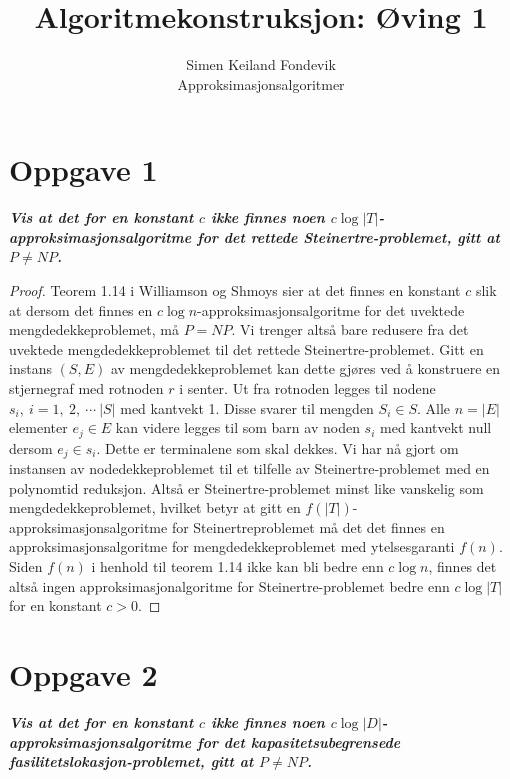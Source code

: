 \documentclass[12pt]{article}
\begin{document}
 
 
\title{Algoritmekonstruksjon: Øving 1}
\author{Simen Keiland Fondevik\\ %
Approksimasjonsalgoritmer}

\maketitle

\section{Oppgave 1}
\it{\textbf{Vis at det for en konstant $c$ ikke finnes noen $c \log |T|$-approksimasjonsalgoritme for det rettede Steinertre-problemet, gitt at $P \neq NP$.}}

\begin{proof}
Teorem 1.14 i Williamson og Shmoys sier at det finnes en konstant $c$ slik at dersom det finnes en $c \log n$-approksimasjonsalgoritme for det uvektede mengdedekkeproblemet, må $P=NP$. Vi trenger altså bare redusere fra det uvektede mengdedekkeproblemet til det rettede Steinertre-problemet. Gitt en instans $(S, E)$ av mengdedekkeproblemet kan dette gjøres ved å konstruere en stjernegraf med rotnoden $r$ i senter. Ut fra rotnoden legges til nodene $s_i,~i = 1, ~2, ~\cdots ~|S|$ med kantvekt 1. Disse svarer til mengden $S_i \in S$. Alle $n = |E|$ elementer $e_j \in E$ kan videre legges til som barn av noden $s_i$ med kantvekt null dersom $e_j \in s_i$. Dette er terminalene som skal dekkes. Vi har nå gjort om instansen av nodedekkeproblemet til et tilfelle av Steinertre-problemet med en polynomtid reduksjon. Altså er Steinertre-problemet minst like vanskelig som mengdedekkeproblemet, hvilket betyr at gitt en $f(|T|)$-approksimasjonsalgoritme for Steinertreproblemet må det det finnes en approksimasjonsalgoritme for mengdedekkeproblemet med ytelsesgaranti $f(n)$. Siden $f(n)$ i henhold til teorem 1.14 ikke kan bli bedre enn $c \log n$, finnes det altså ingen approksimasjonalgoritme for Steinertre-problemet bedre enn $c \log |T|$ for en konstant $c>0$.
\end{proof}

\section{Oppgave 2}
\it{\textbf{Vis at det for en konstant $c$ ikke finnes noen $c \log |D|$-approksimasjonsalgoritme for det kapasitetsubegrensede fasilitetslokasjon-problemet, gitt at $P \neq NP$.}}
\end{document}

